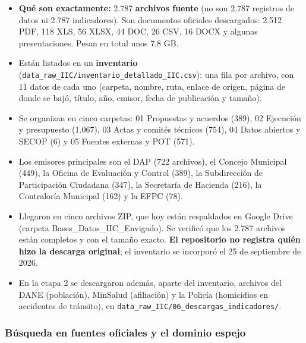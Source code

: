 \documentclass[11pt,letterpaper]{article}
\begin{document}
\begin{itemize}
\item \textbf{Qué son exactamente:} 2.787 \textbf{archivos fuente} (no son 2.787 registros de datos ni 2.787 indicadores). Son documentos oficiales descargados: 2.512 PDF, 118 XLS, 56 XLSX, 44 DOC, 26 CSV, 16 DOCX y algunas presentaciones. Pesan en total unos 7,8 GB.
\item Están listados en un \textbf{inventario} (\texttt{\footnotesize data\_\allowbreak{}raw\_\allowbreak{}IIC/\allowbreak{}inventario\_\allowbreak{}detallado\_\allowbreak{}IIC.\allowbreak{}csv}): una fila por archivo, con 11 datos de cada uno (carpeta, nombre, ruta, enlace de origen, página de donde se bajó, título, año, emisor, fecha de publicación y tamaño).
\item Se organizan en cinco carpetas: 01 Propuestas y acuerdos (389), 02 Ejecución y presupuesto (1.067), 03 Actas y comités técnicos (754), 04 Datos abiertos y SECOP (6) y 05 Fuentes externas y POT (571).
\item Los emisores principales son el DAP (722 archivos), el Concejo Municipal (449), la Oficina de Evaluación y Control (389), la Subdirección de Participación Ciudadana (347), la Secretaría de Hacienda (216), la Contraloría Municipal (162) y la EFPC (78).
\item Llegaron en cinco archivos ZIP, que hoy están respaldados en Google Drive (carpeta Bases\_Datos\_IIC\_Envigado). Se verificó que los 2.787 archivos están completos y con el tamaño exacto. \textbf{El repositorio no registra quién hizo la descarga original}; el inventario se incorporó el 25 de septiembre de 2026.
\item En la etapa 2 se descargaron además, aparte del inventario, archivos del DANE (población), MinSalud (afiliación) y la Policía (homicidios en accidentes de tránsito), en \texttt{\footnotesize data\_\allowbreak{}raw\_\allowbreak{}IIC/\allowbreak{}06\_\allowbreak{}descargas\_\allowbreak{}indicadores/\allowbreak{}}.
\end{itemize}

\subsubsection*{Búsqueda en fuentes oficiales y el dominio espejo}
\end{document}
